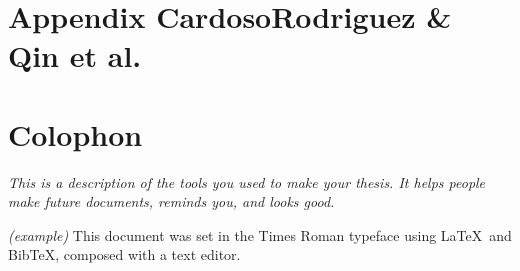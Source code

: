 \chapter{Appendix CardosoRodriguez \& Qin et al.}
\label{appendix:XXX}





\chapter{Colophon}
\label{appendix3label}
\textit{This is a description of the tools you used to make your thesis. It helps people make future documents, reminds you, and looks good.}

\textit{(example)} This document was set in the Times Roman typeface using \LaTeX\ and Bib\TeX , composed with a text editor. 

